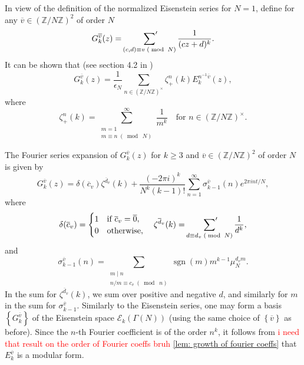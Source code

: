 \documentclass[10pt,leqno,twoside]{article}
\theoremstyle{plain}
\theoremstyle{definition}
\numberwithin{equation}{section}
\numberwithin{lem}{section}
\newcommand{\cbr}[1]{\left\{#1\right\}}
\newcommand{\smod}[1]{\;(\bmod\; #1)}
\DeclareMathOperator{\sgn}{sgn}
\newcommand{\sai}[1]{\textcolor{red}{#1}}
\begin{document}
In view of the definition of the normalized Eisenstein series for $N = 1$, define for any $\overline v\in (\mathbb Z/N\mathbb Z)^2$ of order $N$
\[G_k^{\overline v}(z) = \sideset{}{^\prime}\sum_{(c,d)\equiv v\smod N}\frac{1}{(cz+d)^k}.\] It can be shown that (see section 4.2 in \cite{diamond})
\[G_k^{\overline v}(z) = \frac{1}{\epsilon_N}\sum_{n\in(\mathbb Z/N\mathbb Z)^\times}\zeta_+^n(k)E_k^{n^{-1}\overline v}(z),\] where \[\zeta_+^n(k) = \sum_{\substack{m=1\\m\equiv n\smod N}}^\infty \frac{1}{m^k}\quad \text{for $n\in (\mathbb Z/N\mathbb Z)^\times$}.\] 

The Fourier series expansion of $G_k^{\overline v}(z)$ for $k\geq 3$ and $\overline v\in (\mathbb Z/N\mathbb Z)^2$ of order $N$ is given by \[G_k^{\overline v}(z) = \delta(\overline c_v)\zeta^{\overline d_v}(k) + \frac{(-2\pi i)^k}{N^k(k-1)!}\sum_{n=1}^\infty \sigma_{k-1}^{\overline v}(n)e^{2\pi i n t/N},\] where \[\delta(\overline c_v) = \begin{cases}
    1 & \text{if $\overline c_v =\overline 0$},\\
    0 & \text{otherwise},
\end{cases}\quad \zeta^{\overline d_v}(k) = \sideset{}{^\prime}\sum_{d\equiv d_v\smod N}\frac{1}{d^k},\] and 
\[\sigma_{k-1}^{\overline v}(n) = \sum_{\substack{m\mid n\\n/m \equiv c_v\smod n}}\sgn(m)m^{k-1}\mu_N^{d_vm}.\] In the sum for $\zeta^{\overline d_v}(k)$, we sum over positive and negative $d$, and similarly for $m$ in the sum for $\sigma_{k-1}^{\overline v}$. Similarly to the Eisenstein series, one may form a basis $\cbr{G_k^{\overline v}}$ of the Eisenstein space $\mathcal E_k(\varGamma(N))$ (using the same choice of $\cbr{\overline v}$ as before). Since the $n$-th Fourier coefficient is of the order $n^k$, it follows from \sai{i need that result on the order of Fourier coeffs bruh} \cref{lem: growth of fourier coeffs} that $E_k^{\overline v}$ is a modular form.
\end{document}
